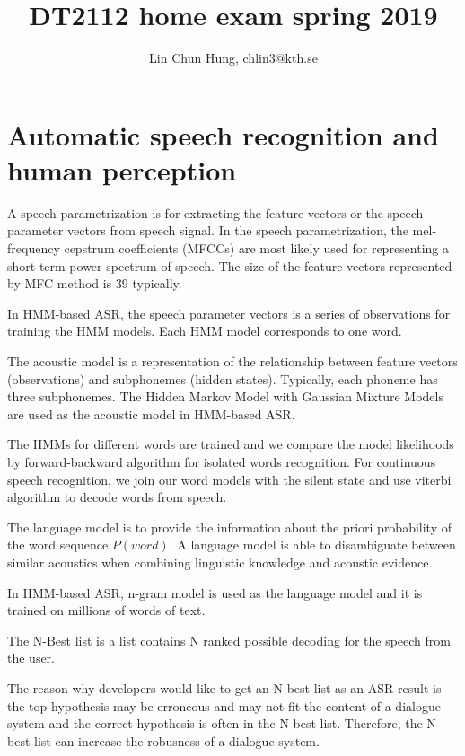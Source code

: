\documentclass[12pt]{article}
\newenvironment{problem}[2][Problem]{\begin{trivlist}
\item[\hskip \labelsep {\bfseries #1}\hskip \labelsep {\bfseries #2.}]}{\end{trivlist}}
\begin{document}
\title{DT2112 home exam spring 2019}
\author{Lin Chun Hung, chlin3@kth.se}
\maketitle

\section{Automatic speech recognition and human perception}
\begin{problem}{1.1}
    A speech parametrization is for extracting the feature vectors or 
    the speech parameter vectors from speech signal. In the speech parametrization,
    the mel-frequency cepstrum coefficients (MFCCs) are most likely used for
    representing a short term power spectrum of speech. The size of the 
    feature vectors represented by MFC method is 39 typically. 

    In HMM-based ASR, the speech parameter vectors is a series of observations
    for training the HMM models. Each HMM model corresponds to one word.
    
    The acoustic model is a representation of the relationship between feature 
    vectors (observations) and subphonemes (hidden states).
    Typically, each phoneme has three subphonemes. The Hidden Markov Model with 
    Gaussian Mixture Models are used as the acoustic model in HMM-based ASR.

    The HMMs for different words are trained and we compare the model likelihoods
    by forward-backward algorithm for isolated words recognition. For continuous
    speech recognition, we join our word models with the silent state and use viterbi 
    algorithm to decode words from speech.

    The language model is to provide the information about the priori probability
    of the word sequence $P(word)$. A language model is able to disambiguate between
    similar acoustics when combining linguistic knowledge and acoustic evidence.
    
    In HMM-based ASR, n-gram model is used as the language model and it is trained
    on millions of words of text.
    
    The N-Best list is a list contains N ranked possible decoding for the speech
    from the user.

    The reason why developers would like to get an N-best list as an ASR result
    is the top hypothesis may be erroneous and may not fit the content of a 
    dialogue system and the correct hypothesis is often in the N-best list. 
    Therefore, the N-best list can increase the robusness of a dialogue system.
\end{problem}
\end{document}
